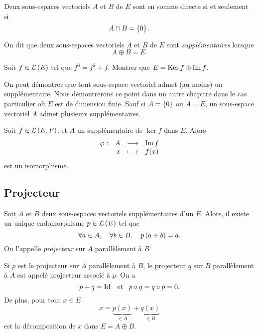 \documentclass{magnolia}
\begin{document}
\begin{proposition}[utile=3]
Deux sous-espaces vectoriels $A$ et $B$ de $E$ sont en somme directe si
et seulement si
\[A\cap B=\left\{0\right\}.\]
\end{proposition}

\begin{definition}[utile=-3]
On dit que deux sous-espaces vectoriels $A$ et $B$ de $E$ sont \emph{supplémentaires}
lorsque
\[A\oplus B=E.\]
\end{definition}


\begin{exoUnique}
\exo Soit $f\in\mathcal{L}\left(E\right)$ tel que $f^3=f^2+f$. Montrer que
  $E=\mathop{\rm Ker} f\oplus\operatorname{Im} f$.
\end{exoUnique}

\begin{remarques}
\remarque On peut démontrer que tout sous-espace vectoriel admet (au moins) un supplémentaire. 
  Nous démontrerons ce point dans un autre chapitre dans le cas particulier où $E$ est de dimension finie.
\remarque Sauf si $A=\left\{0\right\}$ ou $A=E$, un sous-espace vectoriel $A$ admet plusieurs supplémentaires.
\end{remarques}

\begin{proposition}[nom={Version géométrique du théorème du rang}]
Soit $f\in\mathcal{L}\left(E,F\right)$, et $A$ un supplémentaire de $\ker f$ dans $E$. Alors
\[\begin{array}[t]{lrcl} \displaystyle{\varphi} : & \displaystyle{A} & \longrightarrow & \displaystyle{\operatorname{Im}f} \\ & \displaystyle{x} & \longmapsto & \displaystyle{f(x)} \end{array}\]
est un isomorphisme.
\end{proposition}

\subsection{Projecteur}

\begin{definition}[utile=-3]
Soit $A$ et $B$ deux sous-espaces vectoriels supplémentaires d'un \Kev $E$.
Alors, il existe un unique endomorphisme $p\in\mathcal{L}\left(E\right)$ tel que
\[\forall a\in A ,\quad \forall b\in B ,\quad p\left(a+b\right)=a.\]
On l'appelle \emph{projecteur} sur $A$ parallèlement à $B$
\end{definition}

\begin{definition}[utile=1]
Si $p$ est le projecteur sur $A$ parallèlement à $B$, le projecteur $q$ sur
$B$ parallèlement à $A$ est appelé projecteur associé à $p$. On a
\[p+q=\operatorname{Id} \quad\!\text{et}\quad\! p\circ q=q\circ p=0.\]
De plus, pour tout $x\in E$
\[x=\underbrace{p(x)}_{\in A}+\underbrace{q(x)}_{\in B}\]  
est la décomposition de $x$ dans $E=A\oplus B$.
\end{definition}
\end{document}
